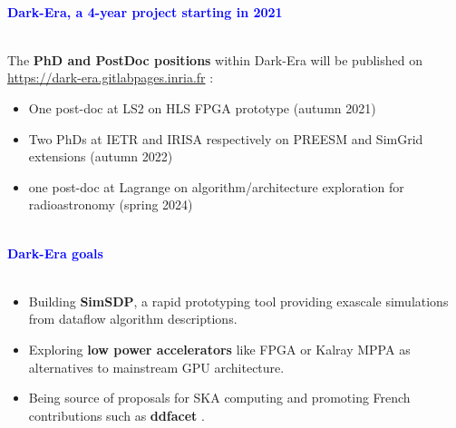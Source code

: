 \documentclass{beamer}
\renewenvironment{block}[1]{%
\begin{Sbox}%
\begin{minipage}[t]{\textwidth}
~\\
\textcolor{blue}{\quad #1}~\\
~\\%
\vspace{0.5cm}
} 
{%
\end{minipage}
\end{Sbox}\Ovalbox{\TheSbox}%
}
\begin{document}
{\begin{columns}[t]
\begin{column}{.49\linewidth}
\begin{block}{\large \textbf{Dark-Era, a 4-year project starting in 2021}}
\begin{minipage}{0.95\textwidth}
The \textbf{PhD and PostDoc positions} within Dark-Era will be published on \href{https://dark-era.gitlabpages.inria.fr}{https://dark-era.gitlabpages.inria.fr} :
\begin{itemize}
    \item One post-doc at LS2 on HLS FPGA prototype (autumn 2021)
    \item Two PhDs at IETR and IRISA respectively on PREESM and SimGrid
    extensions (autumn 2022)
    \item one post-doc at Lagrange on algorithm/architecture exploration for radioastronomy (spring 2024)
\end{itemize}
 \end{minipage}
\end{block}

\begin{block}{\large \textbf{Dark-Era goals}}
 \begin{minipage}{0.95\textwidth}
 \begin{itemize}
 \item[#1] Building \textbf{SimSDP}, a rapid prototyping tool providing exascale simulations from dataflow algorithm descriptions.
 \item[#2] Exploring \textbf{low power accelerators} like FPGA or Kalray MPPA as alternatives to mainstream GPU architecture.
 \item[#3] Being source of proposals for SKA computing and promoting French contributions such as \textbf{ddfacet} \cite{Tasse18}.
 \end{itemize}
 \end{minipage}
\end{block}


\end{column}
\end{columns}}
\end{document}
